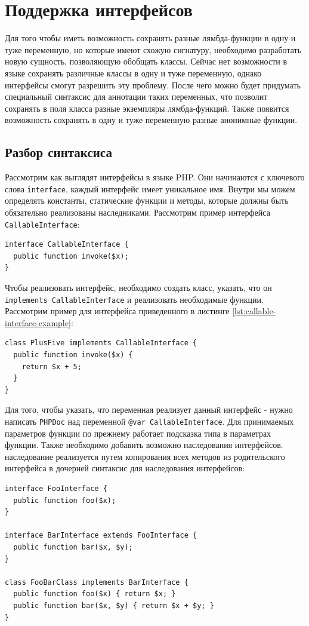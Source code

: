 \section{Поддержка интерфейсов}
Для того чтобы иметь возможность сохранять разные лямбда-функции в одну и туже переменную, но которые имеют схожую сигнатуру, необходимо разработать новую сущность, позволяющую обобщать классы.
Сейчас нет возможности в языке сохранять различные классы в одну и туже переменную, однако интерфейсы смогут разрешить эту проблему.
После чего можно будет придумать специальный синтаксис для аннотации таких переменных, что позволит сохранять в поля класса разные экземпляры лямбда-функций.
Также появится возможность сохранять в одну и туже переменную разные анонимные функции.

\subsection{Разбор синтаксиса}
Рассмотрим как выглядят интерфейсы в языке PHP.
Они начинаются с ключевого слова \verb|interface|, каждый интерфейс имеет уникальное имя.
Внутри мы можем определять константы, статические функции и методы, которые должны быть обязательно реализованы наследниками.
Рассмотрим пример интерфейса \verb|CallableInterface|:
\begin{lstlisting}[caption={Пример интерфейса Callable},label={lst:callable-interface-example}]
interface CallableInterface {
  public function invoke($x);
}
\end{lstlisting}

Чтобы реализовать интерфейс, необходимо создать класс, указать, что он \verb|implements CallableInterface| и реализовать необходимые функции.
Рассмотрим пример для интерфейса приведенного в листинге \ref{lst:callable-interface-example}:
\begin{lstlisting}
class PlusFive implements CallableInterface {
  public function invoke($x) {
    return $x + 5;
  } 
}
\end{lstlisting}

Для того, чтобы указать, что переменная реализует данный интерфейс - нужно написать \verb|PHPDoc| \cite{phpdoc} над переменной \verb|@var CallableInterface|.
Для принимаемых параметров функции по прежнему работает подсказка типа в параметрах функции.
Также необходимо добавить возможно наследования интерфейсов.
наследование реализуется путем копирования всех методов из родительского интерфейса в дочерней синтаксис для наследования интерфейсов:
\begin{lstlisting}
interface FooInterface {
  public function foo($x);
}

interface BarInterface extends FooInterface {
  public function bar($x, $y);
}

class FooBarClass implements BarInterface {
  public function foo($x) { return $x; }
  public function bar($x, $y) { return $x + $y; }
}
\end{lstlisting}

